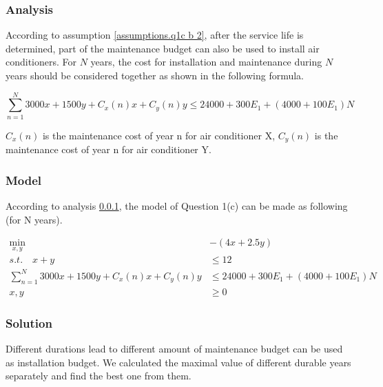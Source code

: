 \documentclass[titlepage,a4paper]{article}
\begin{document}
        \subsubsection{Analysis} \label{analysis.q1c b}
        
        According to assumption \ref{assumptions.q1c b 2}, after the service life is determined, part of the maintenance budget can also be used to install air conditioners. For $N$ years, the cost for installation and maintenance during $N$ years should be considered together as shown in the following formula.

            \begin{equation}
                \sum_{n=1}^N 3000x+1500y+C_x(n)x+C_y(n)y \leq 24000+300E_1+(4000+100E_1)N 
            \end{equation}

        $C_x(n)$ is the maintenance cost of year n for air conditioner X, $C_y(n)$ is the maintenance cost of year n for air conditioner Y.

        \subsubsection{Model}

        According to analysis \ref{analysis.q1c b}, the model of Question 1(c) can be made as following (for N years).
        
        \begin{equation}
            \begin{aligned}      
                \min_{x,y} & -(4x+2.5y)   \\
                s.t. \quad x+y   & \leq  12 \\
                \sum_{n=1}^N 3000x+1500y+C_x(n)x+C_y(n)y & \leq 24000+300E_1+(4000+100E_1)N \\
                x,y & \geq 0   
            \end{aligned}
        \end{equation}
        
        \subsubsection{Solution}

        Different durations lead to different amount of maintenance budget can be used as installation budget. We calculated the maximal value of different durable years separately and find the best one from them. 
\end{document}
